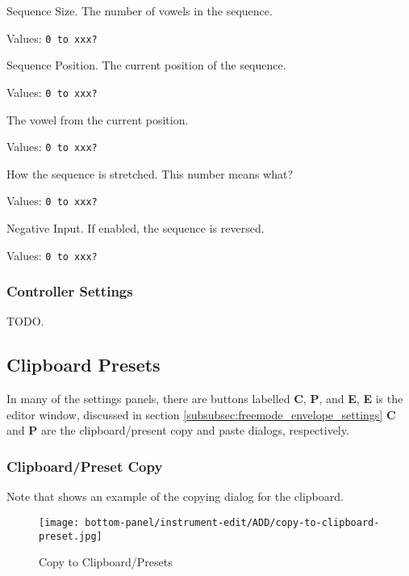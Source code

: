    Sequence Size.
   The number of vowels in the sequence.

   Values:  \texttt{0 to xxx?}

   Sequence Position.
   The current position of the sequence.

   Values:  \texttt{0 to xxx?}

   The vowel from the current position.

   Values:  \texttt{0 to xxx?}

   How the sequence is stretched.
   This number means what?

   Values:  \texttt{0 to xxx?}

   Negative Input.
   If enabled, the sequence is reversed.

   Values:  \texttt{0 to xxx?}

\subsubsection{Controller Settings}
\label{subsubsec:controller_settings}

TODO.

\subsection{Clipboard Presets}
\label{subsec:clipboard_presets}

In many of the settings panels, there are buttons
labelled \textbf{C}, \textbf{P}, and \textbf{E},
\textbf{E} is the editor window, discussed in 
section \ref{subsubsec:freemode_envelope_settings}
\textbf{C} and \textbf{P} are the clipboard/present copy and paste
dialogs, respectively.

\subsubsection{Clipboard/Preset Copy}
\label{subsubsec:clipboard_copy}

   Note that 
   shows an example of the copying dialog for the clipboard.

\begin{figure}[H]
   \centering 
   \texttt{[image: bottom-panel/instrument-edit/ADD/copy-to-clipboard-preset.jpg]}
   \caption[Copy to Clipboard]{Copy to Clipboard/Presets}
   \label{fig:copy_to_clipboard} 
\end{figure}

